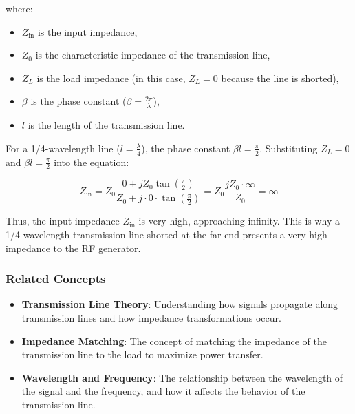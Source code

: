 where:
\begin{itemize}
    \item \( Z_{\text{in}} \) is the input impedance,
    \item \( Z_0 \) is the characteristic impedance of the transmission line,
    \item \( Z_L \) is the load impedance (in this case, \( Z_L = 0 \) because the line is shorted),
    \item \( \beta \) is the phase constant (\( \beta = \frac{2\pi}{\lambda} \)),
    \item \( l \) is the length of the transmission line.
\end{itemize}

For a 1/4-wavelength line (\( l = \frac{\lambda}{4} \)), the phase constant \( \beta l = \frac{\pi}{2} \). Substituting \( Z_L = 0 \) and \( \beta l = \frac{\pi}{2} \) into the equation:

\[
Z_{\text{in}} = Z_0 \frac{0 + j Z_0 \tan\left(\frac{\pi}{2}\right)}{Z_0 + j \cdot 0 \cdot \tan\left(\frac{\pi}{2}\right)} = Z_0 \frac{j Z_0 \cdot \infty}{Z_0} = \infty
\]

Thus, the input impedance \( Z_{\text{in}} \) is very high, approaching infinity. This is why a 1/4-wavelength transmission line shorted at the far end presents a very high impedance to the RF generator.

\subsubsection{Related Concepts}
\begin{itemize}
    \item \textbf{Transmission Line Theory}: Understanding how signals propagate along transmission lines and how impedance transformations occur.
    \item \textbf{Impedance Matching}: The concept of matching the impedance of the transmission line to the load to maximize power transfer.
    \item \textbf{Wavelength and Frequency}: The relationship between the wavelength of the signal and the frequency, and how it affects the behavior of the transmission line.
\end{itemize}

